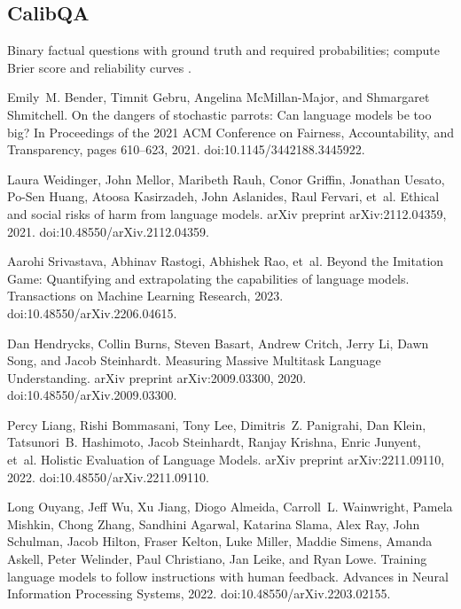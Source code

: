 \documentclass[11pt]{article}
\begin{document}
\subsection*{CalibQA}
Binary factual questions with ground truth and required probabilities; compute Brier score and reliability curves \citep{Liang2022HELM,Lin2022TruthfulQA,Guo2017Calibration}.

\begin{thebibliography}{99}

Emily~M. Bender, Timnit Gebru, Angelina McMillan-Major, and Shmargaret Shmitchell.
\newblock On the dangers of stochastic parrots: Can language models be too big?
\newblock In Proceedings of the 2021 ACM Conference on Fairness, Accountability, and Transparency, pages 610--623, 2021.
\newblock doi:10.1145/3442188.3445922.

Laura Weidinger, John Mellor, Maribeth Rauh, Conor Griffin, Jonathan Uesato, Po-Sen Huang, Atoosa Kasirzadeh, John Aslanides, Raul Fervari, et~al.
\newblock Ethical and social risks of harm from language models.
\newblock arXiv preprint arXiv:2112.04359, 2021.
\newblock doi:10.48550/arXiv.2112.04359.

Aarohi Srivastava, Abhinav Rastogi, Abhishek Rao, et~al.
\newblock Beyond the Imitation Game: Quantifying and extrapolating the capabilities of language models.
\newblock Transactions on Machine Learning Research, 2023.
\newblock doi:10.48550/arXiv.2206.04615.

Dan Hendrycks, Collin Burns, Steven Basart, Andrew Critch, Jerry Li, Dawn Song, and Jacob Steinhardt.
\newblock Measuring Massive Multitask Language Understanding.
\newblock arXiv preprint arXiv:2009.03300, 2020.
\newblock doi:10.48550/arXiv.2009.03300.

Percy Liang, Rishi Bommasani, Tony Lee, Dimitris~Z. Panigrahi, Dan Klein, Tatsunori~B. Hashimoto, Jacob Steinhardt, Ranjay Krishna, Enric Junyent, et~al.
\newblock Holistic Evaluation of Language Models.
\newblock arXiv preprint arXiv:2211.09110, 2022.
\newblock doi:10.48550/arXiv.2211.09110.

Long Ouyang, Jeff Wu, Xu Jiang, Diogo Almeida, Carroll~L. Wainwright, Pamela Mishkin, Chong Zhang, Sandhini Agarwal, Katarina Slama, Alex Ray, John Schulman, Jacob Hilton, Fraser Kelton, Luke Miller, Maddie Simens, Amanda Askell, Peter Welinder, Paul Christiano, Jan Leike, and Ryan Lowe.
\newblock Training language models to follow instructions with human feedback.
\newblock Advances in Neural Information Processing Systems, 2022.
\newblock doi:10.48550/arXiv.2203.02155.


\end{thebibliography}
\end{document}
